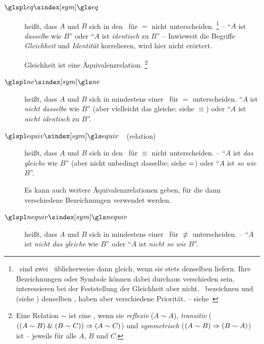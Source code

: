 \begin{description}
	\item[$\glsSym{eq}$~~\emph{}]\label{def:Gleichheit}
	 heißt, dass $A$ und $B$ sich in den \interessierendenEigenschaften\ für $=$ nicht unterscheiden.%
	\footnote{%
		\textZB\ sind zwei \Junktoren\ üblicherweise dann gleich, wenn sie stets denselben \emph{} liefern.
		Ihre Bezeichnungen oder Symbole können dabei durchaus verschieden sein, interessieren bei der Feststellung der Gleichheit aber nicht.
		\textZB\ bezeichnen \chrqt{$\metaandsym$} und \chrqt{$\srand$} (siehe ) denselben \Operator, haben aber verschiedene Priorität. -- siehe~
	}
	-- \enquote{$A$ ist \emph{dasselbe} wie $B$} oder \enquote{$A$ ist \emph{identisch} zu $B$}
	-- Inwieweit die Begriffe \emph{Gleichheit} und \emph{Identität} korrelieren, wird hier nicht erörtert.

	Gleichheit ist eine Äquivalenzrelation.%
	\footnote{%
		Eine Relation $\sim$ ist eine , wenn sie \emph{reflexiv} ($A \sim A$), \emph{transitiv} ($((A \sim B) \;\&\; (B \sim C)) \Rightarrow (A \sim C)$) und \emph{symmetrisch} ($(A \sim B) \Rightarrow (B \sim A)$) ist -- jeweils für alle $A$, $B$ und $C$.
	}
	\item[$\glsSym{ne}$~~\emph{}]\label{def:Ungleichheit}
	 heißt, dass $A$ und $B$ sich in mindestens einer \interessierendenEigenschaft\ für $=$ unterscheiden. \enquote{$A$ ist \emph{nicht dasselbe} wie $B$} (aber vielleicht das gleiche; siehe $\equiv$) oder \enquote{$A$ ist \emph{nicht identisch} zu $B$}.
	\item[$\glsSym{equiv}$~~\emph{}(relation)]\label{def:Äquivalenz}
	 heißt, dass $A$ und $B$ sich in den \interessierendenEigenschaften\ für $\equiv$ nicht unterscheiden.
	-- \enquote{$A$ ist \emph{das gleiche} wie $B$} (aber nicht unbedingt dasselbe; siehe $=$) oder \enquote{$A$ ist \emph{so wie} $B$}.

	Es kann auch weitere Äquivalenzrelationen geben, für die dann verschiedene Bezeichnungen verwendet werden.
	\item[$\glsSym{nequiv}$~~\emph{}]\label{def:Kontravalenz}
	 heißt, dass $A$ und $B$ sich in mindestens einer \interessierendenEigenschaft\ für $\nequiv$ unterscheiden.
	-- \enquote{$A$ ist \emph{nicht das gleiche} wie $B$} oder \enquote{$A$ ist \emph{nicht so wie} $B$}.
\end{description}

